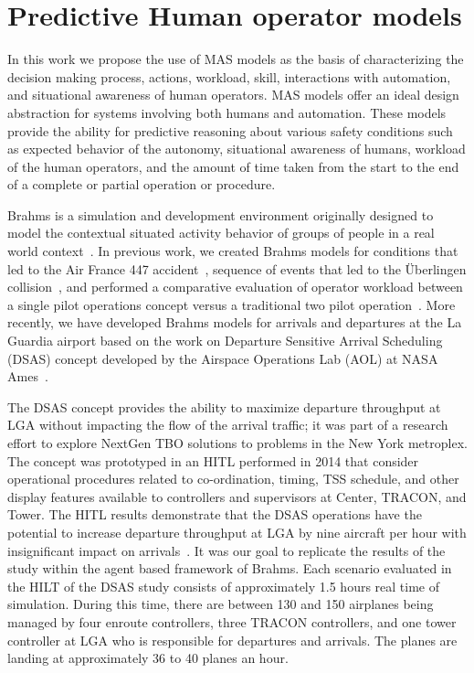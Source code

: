 \documentclass[12pt]{article}
\begin{document}
\section{Predictive Human operator models} 

In this work we propose the use of MAS models as the basis of
characterizing the decision making process, actions, workload, skill,
interactions with automation, and situational awareness of human
operators.  MAS models offer an ideal design abstraction for systems
involving both humans and automation. These models provide the ability
for predictive reasoning about various safety conditions such as
expected behavior of the autonomy, situational awareness of humans,
workload of the human operators, and the amount of time taken from the
start to the end of a complete or partial operation or procedure.

Brahms is a simulation and development environment originally designed
to model the contextual situated activity behavior of groups of people
in a real world context~\cite{clancey1998brahms,SierhuisPhD}. In previous work, we created Brahms models for conditions that led to the Air France 447 accident~\cite{hunter:aamas13}, sequence of events that led to the \"{U}berlingen collision~\cite{Rungta:2013}, and performed a comparative evaluation of operator workload between a single pilot operations concept versus a traditional two pilot operation~\cite{Stocker:2015}. More recently, we have developed Brahms models for arrivals and departures at the La Guardia airport based on the work on Departure Sensitive Arrival Scheduling (DSAS) concept developed by the Airspace Operations Lab (AOL) at NASA Ames~\cite{dsas}. 

The DSAS concept provides the ability to maximize departure throughput at LGA without impacting the flow of the arrival traffic; it was part of a research effort to explore NextGen TBO solutions to problems in the New York metroplex. The concept was prototyped in an HITL performed in 2014 that consider operational procedures related to co-ordination, timing, TSS schedule, and other display features available to controllers and supervisors at Center, TRACON, and Tower. The HITL results demonstrate that the DSAS operations have the potential to increase departure throughput at LGA by nine aircraft per hour with insignificant impact on arrivals~\cite{dsas}.  It was our goal to replicate the results of the study within the agent based framework of Brahms. Each scenario evaluated in the HILT of the DSAS study consists of approximately 1.5 hours real time of simulation. During this time, there are between 130 and 150 airplanes being managed by four enroute controllers, three TRACON controllers, and one tower controller at LGA who is responsible for departures and arrivals. The planes are landing at approximately 36 to 40 planes an hour. 
\end{document}
